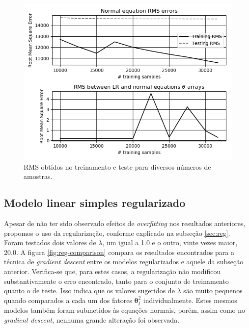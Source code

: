 \documentclass[10pt,twocolumn,letterpaper]{article}
\begin{document}
\begin{figure}
    \centering
    \includegraphics[width=0.9\columnwidth]{img/lr-norm.png}
    \caption{RMS obtidos no treinamento e teste para diversos números de amostras.}
    \label{fig:lr-norm}
\end{figure}

\subsection{Modelo linear simples regularizado}

Apesar de não ter sido observado efeitos de \textit{overfitting} nos resultados anteriores, propomos o uso da regularização, conforme explicado na subseção \ref{sec:reg}. Foram testados dois valores de \(\lambda\), um igual a 1.0 e o outro, vinte vezes maior, 20.0. A figura \ref{fig:reg-comparison} compara os resultados encontrados para a técnica de \textit{gradient descent} entre os modelos regularizados e aquele da subseção anterior. Verifica-se que, para estes casos, a regularização não modificou substantivamente o erro encontrado, tanto para o conjunto de treinamento quanto o de teste. Isso indica que os valores sugeridos de \(\lambda\) são muito pequenos quando comparados a cada um dos fatores \(\bm{\theta}_j^2\) individualmente.  Estes mesmos modelos também foram submetidos às equações normais, porém, assim como no \textit{gradient descent}, nenhuma grande alteração foi observada.
\end{document}
